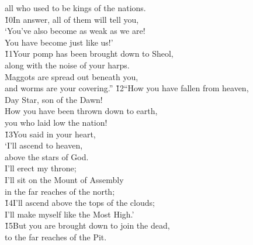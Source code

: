 \begin{poetry}
\poemll    all who used to be kings of the nations. \\
\poeml \v{10}In answer, all of them will tell you, \\
\poemll    `You've also become as weak as we are! \\
\poeml You have become just like us!' \\
\poeml \v{11}Your pomp has been brought down to Sheol, \\
\poemll    along with the noise of your harps. \\
\poeml Maggots are spread out beneath you, \\
\poemll    and worms are your covering.''
\poeml \v{12}``How you have fallen from heaven, \\
\poemll    Day Star, son of the Dawn! \\
\poeml How you have been thrown down to earth, \\
\poemll    you who laid low the nation! \\
\poeml \v{13}You said in your heart, \\
\poemll    `I'll ascend to heaven, \\
\poemlll       above the stars of God. \\
\poeml I'll erect my throne; \\
\poemll    I'll sit on the Mount of Assembly \\
\poemlll       in the far reaches of the north; \\
\poeml \v{14}I'll ascend above the tops of the clouds; \\
\poemll    I'll make myself like the Most High.' \\
\poeml \v{15}But you are brought down to join the dead, \\
\poemll    to the far reaches of the Pit. \\

\end{poetry}

